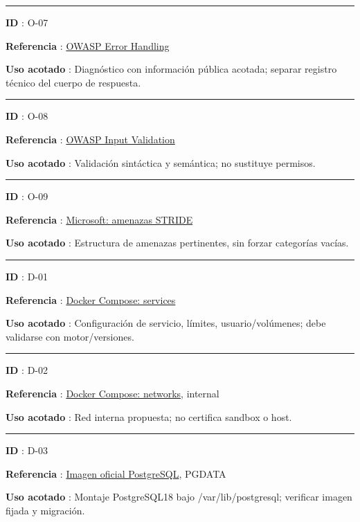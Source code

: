 \documentclass[12pt,a4paper]{report}
\begin{document}
\medskip\hrule\medskip

\textbf{ID }: O-07

\textbf{Referencia
}: \href{https://cheatsheetseries.owasp.org/cheatsheets/Error_Handling_Cheat_Sheet.html}{OWASP
Error Handling}

\textbf{Uso acotado }: Diagnóstico con información pública acotada;
separar registro técnico del cuerpo de respuesta.

\medskip\hrule\medskip

\textbf{ID }: O-08

\textbf{Referencia
}: \href{https://cheatsheetseries.owasp.org/cheatsheets/Input_Validation_Cheat_Sheet.html}{OWASP
Input Validation}

\textbf{Uso acotado }: Validación sintáctica y semántica; no sustituye
permisos.

\medskip\hrule\medskip

\textbf{ID }: O-09

\textbf{Referencia
}: \href{https://learn.microsoft.com/en-us/azure/security/develop/threat-modeling-tool-threats}{Microsoft:
amenazas STRIDE}

\textbf{Uso acotado }: Estructura de amenazas pertinentes, sin forzar
categorías vacías.

\medskip\hrule\medskip

\textbf{ID }: D-01

\textbf{Referencia
}: \href{https://docs.docker.com/reference/compose-file/services/}{Docker
Compose: services}

\textbf{Uso acotado }: Configuración de servicio, límites,
usuario/volúmenes; debe validarse con motor/versiones.

\medskip\hrule\medskip

\textbf{ID }: D-02

\textbf{Referencia
}: \href{https://docs.docker.com/reference/compose-file/networks/}{Docker
Compose: networks}, internal

\textbf{Uso acotado }: Red interna propuesta; no certifica sandbox o
host.

\medskip\hrule\medskip

\textbf{ID }: D-03

\textbf{Referencia
}: \href{https://raw.githubusercontent.com/docker-library/docs/master/postgres/README.md}{Imagen
oficial PostgreSQL}, PGDATA

\textbf{Uso acotado }: Montaje PostgreSQL18 bajo /var/lib/postgresql;
verificar imagen fijada y migración.
\end{document}
